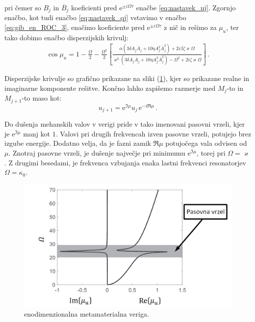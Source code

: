         pri čemer so $B_j$ in $\overline{B}_j$ koeficienti pred $\mathrm{e}^{\pm i\Omega \tau}$ enačbe \eqref{eq:nastavek_uj}. Zgornjo enačbo, kot tudi enačbo \eqref{eq:nastavek_qj} vstavimo v enačbo \eqref{eq:gib_en_ROC_3}, enačimo koeficiente pred $ \mathrm{e}^{\pm i\Omega \tau}$ z nič in rešimo za $\mu_u$, ter tako dobimo enačbo disperzijskih krivulj:
        \begin{align}\label{eq:disperzijska_krivulja}
            \cos{\mu_u}=1-\frac{\Omega}{2}
            -\frac{\Omega^2}{2} \left[ \frac{\alpha(3 \delta A_j \overline{A}_{j}  + 10 \eta A_j^2 \overline{A}_{j}^2  ) + 2 i \beta \zeta \varkappa \Omega}{\varkappa^2 (3 \delta A_j \overline{A}_{j}  + 10 \eta  A_j^2 \overline{A}_{j}^2 ) - \Omega^2 + 2 i \zeta \varkappa \Omega} \right] \,.
        \end{align}
        
        Disperzijske krivulje so grafično prikazane na sliki (\ref{fig:teoreticna_disperzijska}), kjer so prikazane realne in imaginarne komponente rešitve. Končno lahko zapišemo razmerje med $M_j$-to in $M_{j+1}$-to maso kot:
        \begin{equation}
            u_{j+1}=\mathrm{e}^{\Im{\mu}} u_j \, \mathrm{e}^{-i \Re{\mu}} \,.
        \end{equation}
        
        Do dušenja mehanskih valov v verigi pride v tako imenovani pasovni vrzeli, kjer je $\mathrm{e}^{\Im{\mu}}$ manj kot $1$. Valovi pri drugih frekvencah izven pasovne vrzeli, potujejo brez izgube energije. Dodatno velja, da je fazni zamik $\Re{\mu}$ potujočega vala odvisen od $\mu$. Znotraj pasovne vrzeli, je dušenje največje pri minimumu $\mathrm{e}^{\Im{\mu}}$, torej pri $\Omega=\varkappa$. Z drugimi besedami, je frekvenca vzbujanja enaka lastni frekvenci resonatorjev $\Omega=\kappa_0$.
        \begin{figure}[!hb]
            \centering
            \includegraphics[scale=0.50]{slike/teorija/disperzijska_teorija.png}
            \caption{enodimenzionalna metamaterialna veriga.}\label{fig:teoreticna_disperzijska}
        \end{figure}
        
        
        